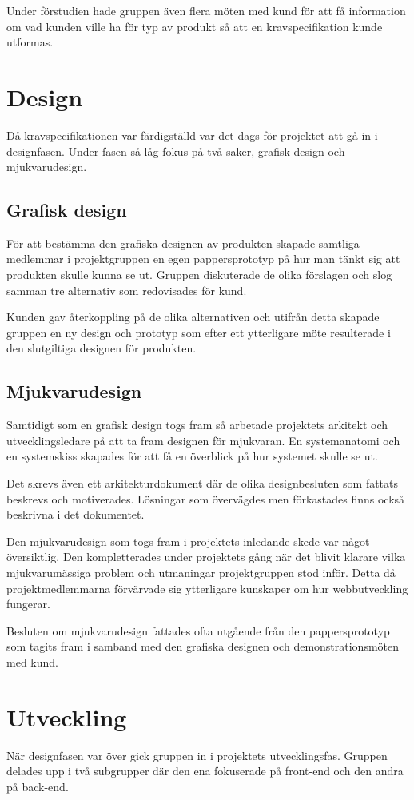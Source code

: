 Under förstudien hade gruppen även flera möten med kund för att få information om vad kunden ville ha för typ av produkt så att en kravspecifikation kunde utformas.

\section{Design}
Då kravspecifikationen var färdigställd var det dags för projektet att gå in i designfasen. Under fasen så låg fokus på två saker, grafisk design och mjukvarudesign.

\subsection{Grafisk design}
För att bestämma den grafiska designen av produkten skapade samtliga medlemmar i projektgruppen en egen pappersprototyp på hur man tänkt sig att produkten skulle kunna se ut. Gruppen diskuterade de olika förslagen och slog samman tre alternativ som redovisades för kund.

Kunden gav återkoppling på de olika alternativen och utifrån detta skapade gruppen en ny design och prototyp som efter ett ytterligare möte resulterade i den slutgiltiga designen för produkten.

\subsection{Mjukvarudesign}
Samtidigt som en grafisk design togs fram så arbetade projektets arkitekt och utvecklingsledare på att ta fram designen för mjukvaran. En systemanatomi och en systemskiss skapades för att få en överblick på hur systemet skulle se ut. 

Det skrevs även ett arkitekturdokument där de olika designbesluten som fattats beskrevs och motiverades. Lösningar som övervägdes men förkastades finns också beskrivna i det dokumentet.

Den mjukvarudesign som togs fram i projektets inledande skede var något översiktlig. Den kompletterades under projektets gång när det blivit klarare vilka mjukvarumässiga problem och utmaningar projektgruppen stod inför. Detta då projektmedlemmarna förvärvade sig ytterligare kunskaper om hur webbutveckling fungerar. 

Besluten om mjukvarudesign fattades ofta utgående från den pappersprototyp som tagits fram i samband med den grafiska designen och demonstrationsmöten med kund.

\section{Utveckling}
När designfasen var över gick gruppen in i projektets utvecklingsfas. Gruppen delades upp i två subgrupper där den ena fokuserade på front-end och den andra på back-end.


